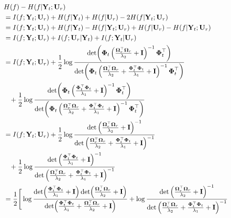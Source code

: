     \begin{align}
       & H(f) - H(f \rvert \mathbf{Y}_t; \mathbf{U}_r) \nonumber
       \\
       & = I(f;\mathbf{Y}_t; \mathbf{U}_r) + H(f \rvert \mathbf{Y}_t)  + H(f \rvert \mathbf{U}_r) - 2 H(f \rvert \mathbf{Y}_t;\mathbf{U}_r) \nonumber
       \\
        & = I(f;\mathbf{Y}_t; \mathbf{U}_r) + H(f \rvert \mathbf{Y}_t) - H(f \rvert \mathbf{Y}_t; \mathbf{U}_r)  + H(f \rvert \mathbf{U}_r) - H(f \rvert \mathbf{Y}_t; \mathbf{U}_r) \nonumber
\\
        &= I(f;\mathbf{Y}_t; \mathbf{U}_r) + I(f;\mathbf{U}_r \rvert \mathbf{Y}_t)  +I(f;\mathbf{Y}_t \rvert \mathbf{U}_r) \nonumber
\\
        &= I(f;\mathbf{Y}_t; \mathbf{U}_r)  + \frac{1}{2} \log \frac{\det(\boldsymbol{\Phi}_t \left(\frac{\boldsymbol{\Omega}_r^\top \boldsymbol{\Omega}_r}{\lambda_2} + \mathbf{I}\right)^{-1} \boldsymbol{\Phi}_t^\top)}{\det(\boldsymbol{\Phi}_t \left(\frac{\boldsymbol{\Omega}_r^\top\boldsymbol{\Omega}_r}{\lambda_2}+\frac{\boldsymbol{\Phi}_t^\top \boldsymbol{\Phi}_t} {\lambda_1} + \mathbf{I}\right)^{-1} \boldsymbol{\Phi}_t^\top)} \notag \\ 
        & \;\;\; + \frac{1}{2} \log \frac{\det(\boldsymbol{\Phi}_t \left(\frac{\boldsymbol{\Phi}_t^\top \boldsymbol{\Phi}_t}{\lambda_1} + \mathbf{I}\right)^{-1} \boldsymbol{\Phi}_t^\top)}{\det(\boldsymbol{\Phi}_t \left(\frac{\boldsymbol{\Omega}_r^\top\boldsymbol{\Omega}_r}{\lambda_2}+\frac{\boldsymbol{\Phi}_t^\top \boldsymbol{\Phi}_t} {\lambda_1} + \mathbf{I}\right)^{-1} \boldsymbol{\Phi}_t^\top)} \nonumber
\\
        &= I(f;\mathbf{Y}_t; \mathbf{U}_r)  + \frac{1}{2} \log \frac{\det \left(\frac{\boldsymbol{\Omega}_r^\top \boldsymbol{\Omega}_r}{\lambda_2} + \mathbf{I}\right)^{-1}}{\det \left(\frac{\boldsymbol{\Omega}_r^\top\boldsymbol{\Omega}_r}{\lambda_2}+\frac{\boldsymbol{\Phi}_t^\top \boldsymbol{\Phi}_t} {\lambda_1} + \mathbf{I}\right)^{-1}} \nonumber 
\\ 
        & \;\;\; + \frac{1}{2} \log \frac{\det\left(\frac{\boldsymbol{\Phi}_t^\top \boldsymbol{\Phi}_t}{\lambda_1} + \mathbf{I}\right)^{-1}}{\det \left(\frac{\boldsymbol{\Omega}_r^\top\boldsymbol{\Omega}_r}{\lambda_2}+\frac{\boldsymbol{\Phi}_t^\top \boldsymbol{\Phi}_t} {\lambda_1} + \mathbf{I}\right)^{-1}} \nonumber
\\
        &= \frac{1}{2} \Bigg[ \log \frac{\det(\frac{\boldsymbol{\Phi}_t^\top \boldsymbol{\Phi}_t}{\lambda_1} + \mathbf{I})\det(\frac{\boldsymbol{\Omega}_r^\top \boldsymbol{\Omega}_r}{\lambda_2} + \mathbf{I})}{\det(\frac{\boldsymbol{\Phi}_t^\top \boldsymbol{\Phi}_t}{\lambda_1} + \frac{\boldsymbol{\Omega}_r^\top \boldsymbol{\Omega}_r}{\lambda_2} + \mathbf{I})} + \log \frac{\det \left(\frac{\boldsymbol{\Omega}_r^\top \boldsymbol{\Omega}_r}{\lambda_2} + \mathbf{I}\right)^{-1}}{\det \left(\frac{\boldsymbol{\Omega}_r^\top\boldsymbol{\Omega}_r}{\lambda_2}+\frac{\boldsymbol{\Phi}_t^\top \boldsymbol{\Phi}_t} {\lambda_1} + \mathbf{I}\right)^{-1}} \nonumber

\end{align}
